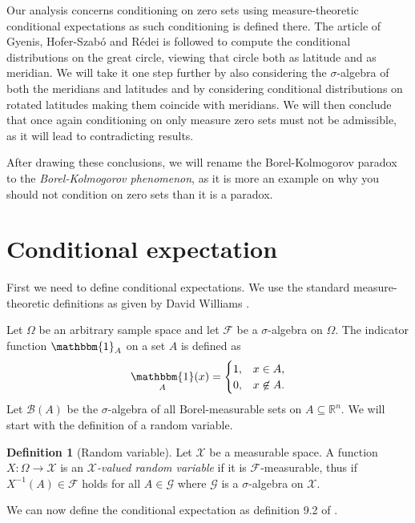 \documentclass[a4paper]{report}
\theoremstyle{plain}
\theoremstyle{definition}
\newtheorem{definition}[theorem]{Definition}
\theoremstyle{remark}
\numberwithin{equation}{chapter}
\newcommand{\R}{\mathbb{R}}
\DeclareMathOperator{\1}{\mathbbm{1}}
\newcommand{\F}{\mathcal{F}}
\renewcommand{\G}{\mathcal{G}}
\newcommand{\B}{\mathcal{B}}
\newcommand{\X}{\mathcal{X}}
\begin{document}
Our analysis concerns conditioning on zero sets using measure-theoretic conditional expectations as such conditioning is defined there. The article of Gyenis, Hofer-Szabó and Rédei \cite{Gyenis17} is followed to compute the conditional distributions on the great circle, viewing that circle both as latitude and as meridian. We will take it one step further by also considering the $\sigma$-algebra of both the meridians and latitudes and by considering conditional distributions on rotated latitudes making them coincide with meridians. We will then conclude that once again conditioning on only measure zero sets must not be admissible, as it will lead to contradicting results.

After drawing these conclusions, we will rename the Borel-Kolmogorov paradox to the \emph{Borel-Kolmogorov phenomenon}, as it is more an example on why you should not condition on zero sets than it is a paradox.

\section{Conditional expectation}
First we need to define conditional expectations. We use the standard measure-theoretic definitions as given by David Williams \cite{Williams91}.

Let $\Omega$ be an arbitrary sample space and let $\mathcal{F}$ be a $\sigma$-algebra on $\Omega$. The indicator function $\1_A$ on a set $A$ is defined as
\begin{equation}
\1_A(x)=\begin{cases}1,&x\in A,\\0,&x\not\in A.\end{cases}
\end{equation}
Let $\B(A)$ be the $\sigma$-algebra of all Borel-measurable sets on $A\subseteq\R^n$. We will start with the definition of a random variable.

\begin{definition}[Random variable]
Let $\X$ be a measurable space. A function $X\colon\Omega\to\X$ is an \emph{$\X$-valued random variable} if it is $\F$-measurable, thus if $X^{-1}(A)\in\F$ holds for all $A\in\G$ where $\G$ is a $\sigma$-algebra on $\X$.
\end{definition}

We can now define the conditional expectation as definition 9.2 of \cite{Williams91}.
\end{document}
